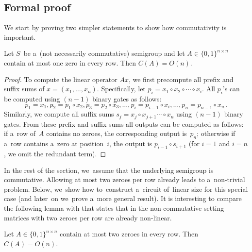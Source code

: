 \subsection{Formal proof}
We start by proving two simpler statements to show how commutativity is
important.

\begin{lemma}\label{lemma:easy}
Let $S$~be a~(not necessarily commutative) semigroup and let
$A \in \{0,1\}^{n \times n}$ contain at most
one zero in every row. Then
$C(A) = O(n)$.
\end{lemma}

\begin{proof}
To compute the linear operator $Ax$, we first
precompute all prefix and suffix sums of $x=(x_1, \dotsc, x_n)$.
Specifically, let $p_i=x_1 \circ x_2 \circ \dotsb \circ x_i$. All $p_i$'s can be
computed using $(n-1)$ binary gates as follows:
\[
p_1=x_1, p_2=p_1 \circ x_2, p_3=p_2 \circ x_3, \dotsc, p_i=p_{i-1} \circ x_i, \dotsc, p_n=p_{n-1}\circ x_n\,.
\]
Similarly, we compute all suffix sums
$s_j=x_j \circ x_{j+1} \dotsb \circ x_n$ using
$(n-1)$ binary gates. From these prefix and suffix sums
all outputs can be
computed as follows: if a~row of~$A$ contains no zeroes,
the corresponding
output is~$p_n$; otherwise if a~row contains a~zero at position~$i$, the
output is $p_{i-1} \circ s_{i+1}$ (for $i=1$ and $i=n$, we omit the redundant
term).
\end{proof}

In the rest of the section, we~assume that the
underlying semigroup is
commutative. Allowing at most two zeroes per row already leads to a~non-trivial
problem.
Below, we~show how to~construct a~circuit of~linear size for
this special case (and later~on we~prove a~more general result).
It is interesting to compare the following lemma
with  that states that in the
non-commutative setting matrices with two zeroes per row are already
%
%
non-linear.
%
%
%
%

\begin{lemma} \label{lem:at_most_2}
Let $A \in \{0,1\}^{n \times n}$ contain at most two zeroes in every row. Then
$C(A) = O(n)$.
\end{lemma}



